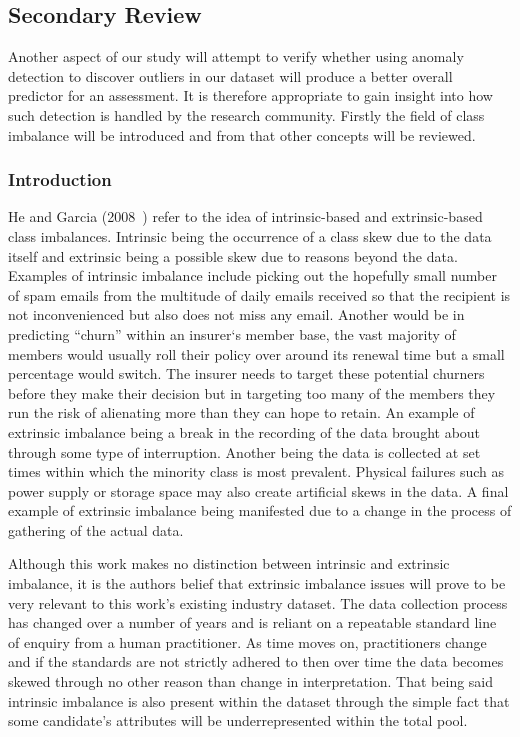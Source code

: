\subsection{Secondary Review}

Another aspect of our study will attempt to verify whether using anomaly detection to discover outliers in our dataset will produce a better overall predictor for an assessment. It is therefore appropriate to gain insight into how such detection is handled by the research community. Firstly the field of class imbalance will be introduced and from that other concepts will be reviewed.

\subsubsection{Introduction}

He and Garcia (2008~\cite{he2008learning}) refer to the idea of intrinsic-based and extrinsic-based class imbalances. Intrinsic being the occurrence of a class skew due to the data itself and extrinsic being a possible skew due to reasons beyond the data. Examples of intrinsic imbalance include picking out the hopefully small number of spam emails from the multitude of daily emails received so that the recipient is not inconvenienced but also does not miss any email. Another would be in predicting ``churn'' within an insurer`s member base, the vast majority of members would usually roll their policy over around its renewal time but a small percentage would switch. The insurer needs to target these potential churners before they make their decision but in targeting too many of the members they run the risk of alienating more than they can hope to retain. An example of extrinsic imbalance being a break in the recording of the data brought about through some type of interruption. Another being the data is collected at set times within which the minority class is most prevalent. Physical failures such as power supply or storage space may also create artificial skews in the data. A final example of extrinsic imbalance being manifested due to a change in the process of gathering of the actual data.
\par
Although this work makes no distinction between intrinsic and extrinsic imbalance, it is the authors belief that extrinsic imbalance issues will prove to be very relevant to this work's existing industry dataset. The data collection process has changed over a number of years and is reliant on a repeatable standard line of enquiry from a human practitioner. As time moves on, practitioners change and if the standards are not strictly adhered to then over time the data becomes skewed through no other reason than change in interpretation. That being said intrinsic imbalance is also present within the dataset through the simple fact that some candidate's attributes will be underrepresented within the total pool.

